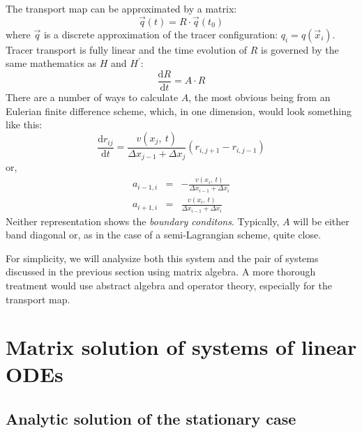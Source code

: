 \documentclass[11pt]{article}
\begin{document}
The transport map can be approximated by a matrix:
\begin{equation}
\vec q(t) = R \cdot \vec q(t_0)
\label{discrete_tracer_map0}
\end{equation}
where $\vec q$ is a discrete approximation of the tracer configuration:
$q_i = q(\vec x_i)$.  Tracer transport is fully linear and the time evolution
of $R$ is governed by the same mathematics as $H$ and $H^\prime$:
\begin{equation}
\frac{\mathrm d R}{\mathrm d t} = A \cdot R
\label{discrete_tracer_map}
\end{equation}
There are a number of ways to calculate $A$, the most obvious being from an 
Eulerian finite difference scheme, which, in one dimension, would look something
like this:
\begin{equation}
\frac{\mathrm d r_{ij}}{\mathrm d t} = \frac{v(x_j,~t)}{\Delta x_{j-1}+\Delta x_j} (r_{i,j+1} - r_{i,j-1})
\label{simple_finite_difference}
\end{equation}
or,
\begin{eqnarray}
a_{i-1,i} & = & - \frac{v(x_i,~t)}{\Delta x_{i-1}+\Delta x_i} \\
a_{i+1,i} & = & \frac{v(x_i,~t)}{\Delta x_{i-1}+\Delta x_i}
\end{eqnarray}
Neither representation shows the {\it boundary conditons}.  Typically, $A$
will be either band diagonal or, as in the case of a semi-Lagrangian
scheme, quite close.

For simplicity, we will analysize both this system and the pair of systems
discussed in the previous section using matrix algebra.  A more thorough
treatment would use abstract algebra and operator theory, especially for
the transport map.

\section{Matrix solution of systems of linear ODEs} 

\subsection{Analytic solution of the stationary case}
\end{document}
